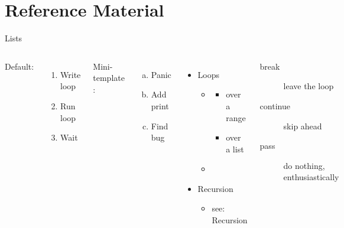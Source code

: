 \documentclass[10pt,aspectratio=169,xcolor=table]{beamer}
\begin{document}
\section{Reference Material}

\begin{frame}{Lists}
  \begin{columns}[T]
      Default:
      \begin{enumerate}
        \item Write loop
        \item Run loop
        \item Wait
      \end{enumerate}
      \medskip
      Mini-template \code{[a)]}:
      \begin{enumerate}[a)]
        \item Panic
        \item Add print
        \item Find bug
      \end{enumerate}
      \begin{itemize}
        \item Loops
          \begin{itemize}
            \item {}
              \begin{itemize}
                \item over a range
                \item over a list
              \end{itemize}
            \item {}
          \end{itemize}
        \item Recursion
          \begin{itemize}
            \item see: Recursion
          \end{itemize}
      \end{itemize}
      \begin{description}
        \item[break] leave the loop
        \item[continue] skip ahead
        \item[pass] do nothing, enthusiastically
      \end{description}
  \end{columns}
\end{frame}
\end{document}
